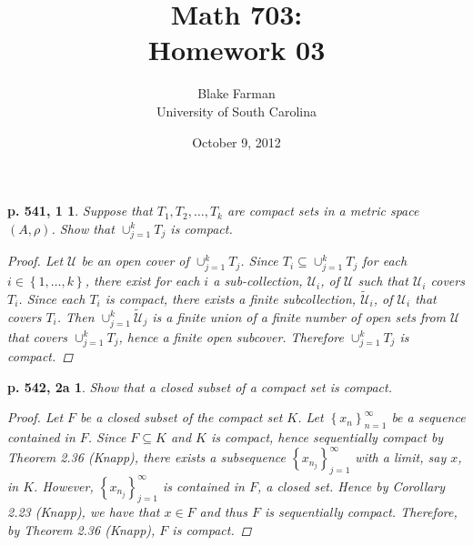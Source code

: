 \documentclass[10pt]{amsart}
\author{Blake Farman\\University of South Carolina}
\title{Math 703:\\Homework 03}
\date{October 9, 2012}
\begin{document}
\maketitle

\providecommand{\norm}[1]{\lVert#1\rVert}
\renewcommand{\qedsymbol}{\ensuremath{\blacksquare}}
\newcommand{\abs}[1]{\left| #1 \right|}
\newcommand{\dist}[2]{\operatorname{dist}\left(#1,#2\right)}

\newtheorem*{ex1}{p. 541, 1}
\newtheorem*{ex2a}{p. 542, 2a}
\newtheorem*{ex3}{p. 542, 3}
\newtheorem*{ex12}{p. 542, 12}
\newtheorem{lem}{Lemma}

\begin{ex1}
  Suppose that $T_1, T_2, \ldots, T_k$ are compact sets in a metric space $(A, \rho)$.
  Show that $\cup_{j=1}^k T_j$ is compact.
  \begin{proof}
    Let $\mathcal{U}$ be an open cover of $\cup_{j=1}^k T_j$.
    Since $T_i \subseteq \cup_{j=1}^k T_j$ for each $i \in \left\{1, \ldots, k\right\}$, there exist for each $i$ a sub-collection, $\mathcal{U}_i$, of $\mathcal{U}$ such that $\mathcal{U}_i$ covers $T_i$.
    Since each $T_i$ is compact, there exists a finite subcollection, $\tilde{\mathcal{U}}_i$, of $\mathcal{U}_i$ that covers $T_i$.
    Then $\cup_{j=1}^k \tilde{\mathcal{U}}_j$ is a finite union of a finite number of open sets from $\mathcal{U}$ that covers $\cup_{j=1}^k T_j$, hence a finite open subcover.
    Therefore $\cup_{j=1}^k T_j$ is compact.
  \end{proof}
\end{ex1}

\begin{ex2a}
  Show that a closed subset of a compact set is compact.
  \begin{proof}
    Let $F$ be a closed subset of the compact set $K$.
    Let $\left\{x_n\right\}_{n=1}^{\infty}$ be a sequence contained in $F$.
    Since $F \subseteq K$ and $K$ is compact, hence sequentially compact by Theorem 2.36 (Knapp), there exists a subsequence $\left\{x_{n_j}\right\}_{j=1}^{\infty}$ with a limit, say $x$, in $K$.
    However, $\left\{x_{n_j}\right\}_{j=1}^{\infty}$ is contained in $F$, a closed set.
    Hence by Corollary 2.23 (Knapp), we have that $x \in F$ and thus $F$ is sequentially compact.
    Therefore, by Theorem 2.36 (Knapp),  $F$ is compact.
  \end{proof}
\end{ex2a}
\end{document}
